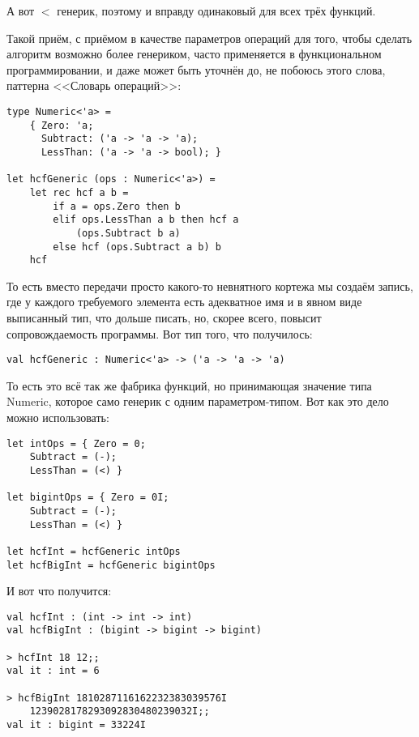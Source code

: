 \documentclass[a5paper]{article}
\begin{document}
А вот $<$ генерик, поэтому и вправду одинаковый для всех трёх функций.

Такой приём, с приёмом в качестве параметров операций для того, чтобы сделать алгоритм возможно более генериком, часто применяется в функциональном программировании, и даже может быть уточнён до, не побоюсь этого слова, паттерна <<Словарь операций>>:

\begin{verbatim}
type Numeric<'a> =
    { Zero: 'a;
      Subtract: ('a -> 'a -> 'a);
      LessThan: ('a -> 'a -> bool); }

let hcfGeneric (ops : Numeric<'a>) =
    let rec hcf a b =
        if a = ops.Zero then b
        elif ops.LessThan a b then hcf a 
            (ops.Subtract b a)
        else hcf (ops.Subtract a b) b
    hcf
\end{verbatim}

То есть вместо передачи просто какого-то невнятного кортежа мы создаём запись, где у каждого требуемого элемента есть адекватное имя и в явном виде выписанный тип, что дольше писать, но, скорее всего, повысит сопровождаемость программы. Вот тип того, что получилось:

\begin{verbatim}
val hcfGeneric : Numeric<'a> -> ('a -> 'a -> 'a)
\end{verbatim}

То есть это всё так же фабрика функций, но принимающая значение типа Numeric, которое само генерик с одним параметром-типом. Вот как это дело можно использовать:

\begin{verbatim}
let intOps = { Zero = 0; 
    Subtract = (-); 
    LessThan = (<) }
    
let bigintOps = { Zero = 0I; 
    Subtract = (-); 
    LessThan = (<) }

let hcfInt = hcfGeneric intOps
let hcfBigInt = hcfGeneric bigintOps
\end{verbatim}

И вот что получится:

\begin{verbatim}
val hcfInt : (int -> int -> int)
val hcfBigInt : (bigint -> bigint -> bigint)

> hcfInt 18 12;;
val it : int = 6

> hcfBigInt 1810287116162232383039576I 
    1239028178293092830480239032I;;
val it : bigint = 33224I
\end{verbatim}
\end{document}
